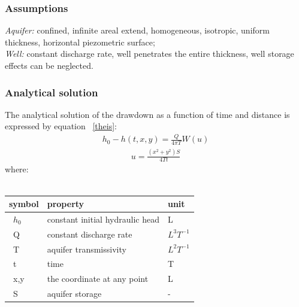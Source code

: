 \subsubsection*{Assumptions}
%
\textit{Aquifer:} confined, infinite areal extend, homogeneous, isotropic, uniform thickness, horizontal piezometric surface;\\
\textit{Well:} constant discharge rate, well penetrates the entire thickness, well storage effects can be neglected.\\
%
\subsubsection*{Analytical solution}
The analytical solution of the drawdown as a function of time and distance is expressed by equation ~\ref{theis}:
%
\begin{eqnarray}
h_0 - h(t,x,y) = \frac{Q}{4\pi T}W(u)
\label{theis}
\end{eqnarray}
%
\begin{eqnarray}
u = \frac{(x^{2}+y^{2})S}{4Tt}
\label{theis_u}
\end{eqnarray}
%
where:\\ \\
%
\begin{tabular}{|l|l|l|}
  \hline
  symbol & property & unit \\
  \hline
  \ $h_0$ & constant initial hydraulic head & L \\
  \hline
  \ Q & constant discharge rate & $L^{3}T^{-1}$ \\
  \hline
  \ T & aquifer transmissivity & $L^{2}T^{-1}$\\
  \hline
  \ t & time & T\\
  \hline
  \ x,y & the coordinate at any point & L\\
  \hline
  \ S & aquifer storage & -\\
  \hline
\end{tabular}
%

